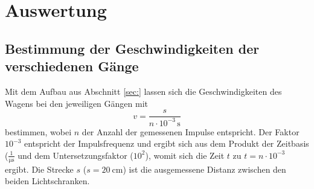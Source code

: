 \section{Auswertung}
\label{sec:Auswertung}
\FloatBarrier
\subsection{Bestimmung der Geschwindigkeiten der verschiedenen Gänge}
Mit dem Aufbau aus Abschnitt \ref{sec:} lassen sich die Geschwindigkeiten des Wagens bei den
jeweiligen Gängen mit
\begin{equation}
	v = \frac{s}{n \cdot 10^{-3} \,\si{\second}}
\end{equation}
bestimmen, wobei $n$ der Anzahl der gemessenen Impulse entspricht.
Der Faktor $10^{-3}$ entspricht der Impulsfrequenz und ergibt sich aus dem Produkt der
Zeitbasis ($\frac{1}{\si{\micro\second}}$ und dem Untersetzungsfaktor ($10^2$), womit sich
die Zeit $t$ zu $t = n \cdot 10^{-3}$ ergibt.
Die Strecke $s$ ($s = \SI{20}{\centi\meter}$) ist die ausgemessene Distanz zwischen den beiden
Lichtschranken.
